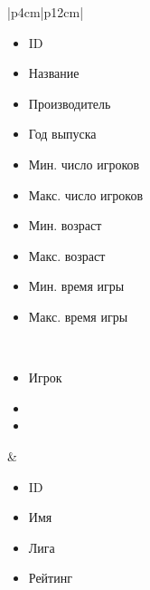 \begin{table}[h!]
\begin{center}
\begin{threeparttable}
\begin{tabular}{|p{4cm}|p{12cm}|}
\begin{minipage}[t]{\linewidth}
\begin{multicols}{2}
                \begin{itemize}[labelsep=0mm,nosep,after=\strut]
                  \item[] ID
                  \item[] Название
                  \item[] Производитель
                  \item[] Год выпуска
                  \item[] Мин. число игроков
                  \item[] Макс. число игроков
                  \item[] Мин. возраст
                  \item[] Макс. возраст
                  \item[] Мин. время игры
                  \item[] Макс. время игры
                \end{itemize}
              \end{multicols}
            \end{minipage}\\
            \hline
            \begin{minipage}[t]{\linewidth}
              \begin{multicols}{1}
                \begin{itemize}[labelsep=0mm,nosep,after=\strut]
                  \item[] Игрок
                  \item[]
                  \item[]
                \end{itemize}
              \end{multicols}
            \end{minipage}
          & \begin{minipage}[t]{\linewidth}
              \begin{multicols}{2}
                \begin{itemize}[labelsep=0mm,nosep,after=\strut]
                  \item[] ID
                  \item[] Имя
                  \item[] Лига
                  \item[] Рейтинг
                \end{itemize}
              \end{multicols}
            \end{minipage}\\

\end{tabular}
\end{threeparttable}
\end{center}
\end{table}
